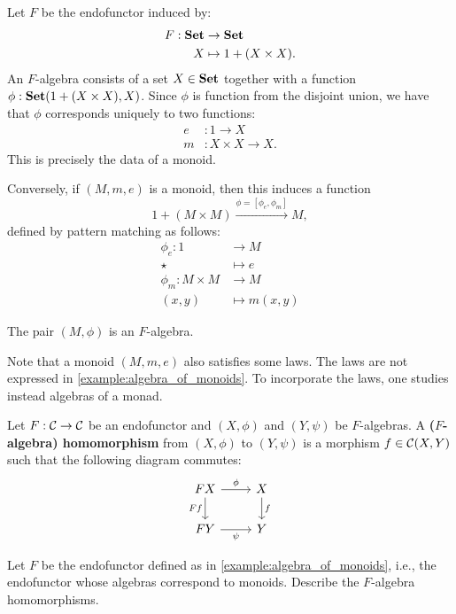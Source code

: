 \begin{exa}\label{example:algebra_of_monoids} Let $F$ be the endofunctor induced by:
\begin{align*}
  F: \mathbf{Set} &\to \mathbf{Set}
  \\
  X &\mapsto 1 + (X\times X).
\end{align*}
An $F$-algebra consists of a set $X\in\mathbf{Set}$ together with a function $\phi:{\mathbf{Set}}(1 + (X\times X),X)$. Since $\phi$ is function from the disjoint union, we have that $\phi$ corresponds uniquely to two functions:
\begin{align*}
e &: 1\to X
\\
m &: X\times X\to X.
\end{align*}
This is precisely the data of a monoid.

Conversely, if $(M,m,e)$ is a monoid, then this induces a function
\[
1 + (M\times M) \xrightarrow{\phi = [\phi_e,\phi_m]} M,
\]
defined by pattern matching as follows:
\begin{align*}
\phi_e : 1 &\to M
\\
\star &\mapsto e
\\
\phi_m : M\times M &\to M 
\\
(x,y) &\mapsto m(x,y)
\end{align*}

The pair $(M, \phi)$ is an $F$-algebra.

\end{exa}

\begin{rem}
 Note that a monoid $(M,m,e)$ also satisfies some laws.
 The laws are not expressed in \cref{example:algebra_of_monoids}.
 To incorporate the laws, one studies instead algebras of a monad.
\end{rem}


\begin{dfn}\label{dfn:alg-hom}
Let $F:\mathcal{C}\to \mathcal{C}$ be an endofunctor and $(X,\phi)$ and $(Y,\psi)$ be $F$-algebras. 
A \textbf{($F$-algebra) homomorphism} from $(X,\phi)$ to $(Y,\psi)$ is a morphism $f\in {\mathcal{C}}(X,Y)$ such that the following diagram commutes:
\[
\begin{tikzcd}
FX
\arrow[r, "\phi"] 
\arrow[d,swap, "Ff"]
& X
\arrow[d, "f"] 
\\
FY
\arrow[r, swap, "\psi"] 
& Y
\end{tikzcd}
\]
\end{dfn}



\begin{exer} 
  Let $F$ be the endofunctor defined as in \cref{example:algebra_of_monoids}, i.e., the endofunctor whose algebras correspond to monoids. 
  Describe the $F$-algebra homomorphisms.
\end{exer}

